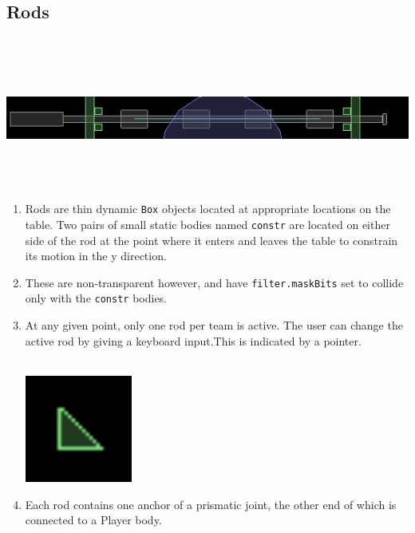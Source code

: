 \documentclass{article}
\begin{document}
\subsection{Rods}~\\
\begin{center}
\includegraphics[width=500pt,height=100pt]{Rod}~\\
\end{center}
\begin{enumerate}
\item Rods are thin dynamic \texttt{Box} objects located at appropriate locations on the table. Two pairs of small static bodies named \texttt{constr} are located on either side of the rod at the point where it enters and leaves the table to constrain its motion in the y direction.\\
\item These are non-transparent however, and have \texttt{filter.maskBits} set to collide only with the \texttt{constr} bodies.\\
\item At any given point, only one rod per team is active. The user can change the active rod by giving a keyboard input.This is indicated by a pointer.\\ \\
\begin{center}
\includegraphics[width=100pt,height=100pt]{Pointer}
\end{center}
\item Each rod contains one anchor of a prismatic joint, the other end of which is connected to a Player body.
\end{enumerate}
\end{document}
